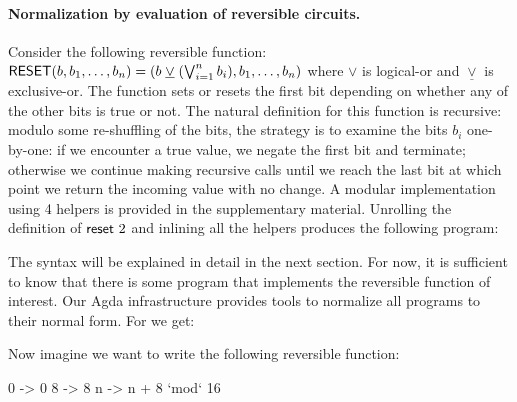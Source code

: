 \paragraph*{Normalization by evaluation of reversible circuits.} Consider the following reversible function:
$\Afun{RESET}(b,b_1,\ldots,b_n) = (b \; \underline{\vee} \; (\bigvee_{i=1}^n b_i),b_1,\ldots,b_n)$ where $\vee$ is
logical-or and $\underline{\vee}$ is exclusive-or. The function sets or resets the first bit depending on whether any of
the other bits is true or not. The natural definition for this function is recursive: modulo some re-shuffling of the
bits, the strategy is to examine the bits $b_i$ one-by-one: if we encounter a true value, we negate the first bit and
terminate; otherwise we continue making recursive calls until we reach the last bit at which point we return the
incoming value with no change. A modular implementation using 4 helpers is provided in the supplementary
material. Unrolling the definition of $\Afun{reset}~2$ and inlining all the helpers produces the following program:


  \resettwo{}

The syntax will be explained in detail in the next section. For now, it is sufficient to know that there is some program
that implements the reversible function of interest. Our Agda infrastructure provides tools to normalize all programs to
their normal form. For  we get:

  \resetnormtwo{}





Now imagine we want to write the following reversible function:

0 -> 0
8 -> 8
n -> n + 8 `mod` 16



